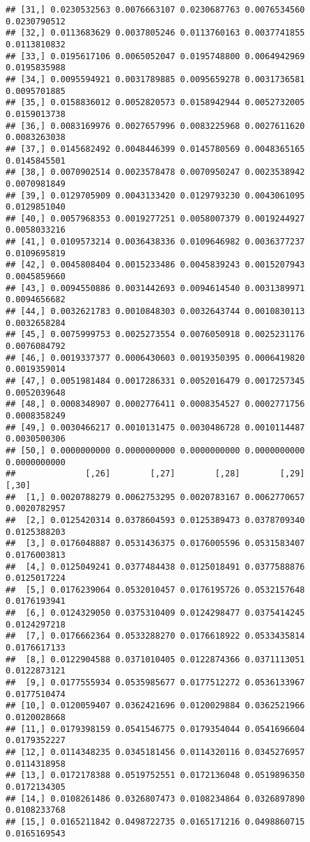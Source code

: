 \documentclass[]{article}
\begin{document}
\begin{verbatim}
## [31,] 0.0230532563 0.0076663107 0.0230687763 0.0076534560 0.0230790512
## [32,] 0.0113683629 0.0037805246 0.0113760163 0.0037741855 0.0113810832
## [33,] 0.0195617106 0.0065052047 0.0195748800 0.0064942969 0.0195835988
## [34,] 0.0095594921 0.0031789885 0.0095659278 0.0031736581 0.0095701885
## [35,] 0.0158836012 0.0052820573 0.0158942944 0.0052732005 0.0159013738
## [36,] 0.0083169976 0.0027657996 0.0083225968 0.0027611620 0.0083263038
## [37,] 0.0145682492 0.0048446399 0.0145780569 0.0048365165 0.0145845501
## [38,] 0.0070902514 0.0023578478 0.0070950247 0.0023538942 0.0070981849
## [39,] 0.0129705909 0.0043133420 0.0129793230 0.0043061095 0.0129851040
## [40,] 0.0057968353 0.0019277251 0.0058007379 0.0019244927 0.0058033216
## [41,] 0.0109573214 0.0036438336 0.0109646982 0.0036377237 0.0109695819
## [42,] 0.0045808404 0.0015233486 0.0045839243 0.0015207943 0.0045859660
## [43,] 0.0094550886 0.0031442693 0.0094614540 0.0031389971 0.0094656682
## [44,] 0.0032621783 0.0010848303 0.0032643744 0.0010830113 0.0032658284
## [45,] 0.0075999753 0.0025273554 0.0076050918 0.0025231176 0.0076084792
## [46,] 0.0019337377 0.0006430603 0.0019350395 0.0006419820 0.0019359014
## [47,] 0.0051981484 0.0017286331 0.0052016479 0.0017257345 0.0052039648
## [48,] 0.0008348907 0.0002776411 0.0008354527 0.0002771756 0.0008358249
## [49,] 0.0030466217 0.0010131475 0.0030486728 0.0010114487 0.0030500306
## [50,] 0.0000000000 0.0000000000 0.0000000000 0.0000000000 0.0000000000
##              [,26]        [,27]        [,28]        [,29]        [,30]
##  [1,] 0.0020788279 0.0062753295 0.0020783167 0.0062770657 0.0020782957
##  [2,] 0.0125420314 0.0378604593 0.0125389473 0.0378709340 0.0125388203
##  [3,] 0.0176048887 0.0531436375 0.0176005596 0.0531583407 0.0176003813
##  [4,] 0.0125049241 0.0377484438 0.0125018491 0.0377588876 0.0125017224
##  [5,] 0.0176239064 0.0532010457 0.0176195726 0.0532157648 0.0176193941
##  [6,] 0.0124329050 0.0375310409 0.0124298477 0.0375414245 0.0124297218
##  [7,] 0.0176662364 0.0533288270 0.0176618922 0.0533435814 0.0176617133
##  [8,] 0.0122904588 0.0371010405 0.0122874366 0.0371113051 0.0122873121
##  [9,] 0.0177555934 0.0535985677 0.0177512272 0.0536133967 0.0177510474
## [10,] 0.0120059407 0.0362421696 0.0120029884 0.0362521966 0.0120028668
## [11,] 0.0179398159 0.0541546775 0.0179354044 0.0541696604 0.0179352227
## [12,] 0.0114348235 0.0345181456 0.0114320116 0.0345276957 0.0114318958
## [13,] 0.0172178388 0.0519752551 0.0172136048 0.0519896350 0.0172134305
## [14,] 0.0108261486 0.0326807473 0.0108234864 0.0326897890 0.0108233768
## [15,] 0.0165211842 0.0498722735 0.0165171216 0.0498860715 0.0165169543

\end{verbatim}
\end{document}
